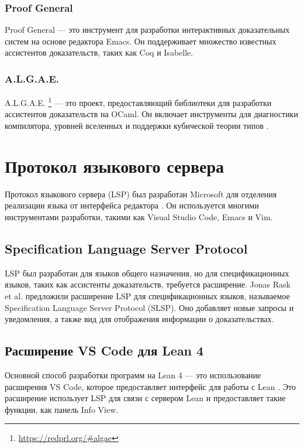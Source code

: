 \subsubsection{Proof General}

Proof General \cite{Aspinall2000} — это инструмент для разработки интерактивных доказательных систем на основе редактора Emacs. Он поддерживает множество известных ассистентов доказательств, таких как Coq и Isabelle.

\subsubsection{A.L.G.A.E.}

A.L.G.A.E. \footnote{\url{https://redprl.org/\#algae}} — это проект, предоставляющий библиотеки для разработки ассистентов доказательств на OCaml. Он включает инструменты для диагностики компилятора, уровней вселенных и поддержки кубической теории типов \cite{Kovacs2021}.

\section{Протокол языкового сервера}

Протокол языкового сервера (LSP) был разработан Microsoft для отделения реализации языка от интерфейса редактора \cite{Buender2019}. Он используется многими инструментами разработки, такими как Visual Studio Code, Emacs и Vim.

\subsection{Specification Language Server Protocol}

LSP был разработан для языков общего назначения, но для спецификационных языков, таких как ассистенты доказательств, требуется расширение. Jonas Rask et al. \cite{JonasKjaerRask2021} предложили расширение LSP для спецификационных языков, называемое Specification Language Server Protocol (SLSP). Оно добавляет новые запросы и уведомления, а также вид для отображения информации о доказательствах.

\subsection{Расширение VS Code для Lean 4}

Основной способ разработки программ на Lean 4 — это использование расширения VS Code, которое предоставляет интерфейс для работы с Lean \cite{Nawrocki2023}. Это расширение использует LSP для связи с сервером Lean и предоставляет такие функции, как панель Info View.

